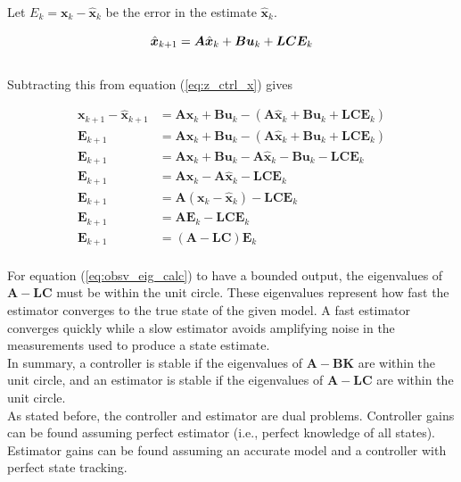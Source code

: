 \documentclass[10pt,conference,compsoc]{IEEEtran}
\newcommand{\mtx}[1] {\bm #1}
\begin{document}
Let $E_k = \mtx{x}_k - \hat{\mtx{x}}_k$ be the error in the estimate
$\hat{\mtx{x}}_k$.

\begin{equation*}
  \hat{\mtx{x}}_{k+1} = \mtx{A}\hat{\mtx{x}}_k + \mtx{B}\mtx{u}_k +
    \mtx{L}\mtx{C}\mtx{E}_k \\
\end{equation*}
\\
Subtracting this from equation (\ref{eq:z_ctrl_x}) gives

\begin{align}
  \mtx{x}_{k+1} - \hat{\mtx{x}}_{k+1} &= \mtx{A}\mtx{x}_k + \mtx{B}\mtx{u}_k -
    (\mtx{A}\hat{\mtx{x}}_k + \mtx{B}\mtx{u}_k +
     \mtx{L}\mtx{C}\mtx{E}_k) \nonumber \\
  \mtx{E}_{k+1} &= \mtx{A}\mtx{x}_k + \mtx{B}\mtx{u}_k -
    (\mtx{A}\hat{\mtx{x}}_k + \mtx{B}\mtx{u}_k + \mtx{L}\mtx{C}\mtx{E}_k)
    \nonumber \\
  \mtx{E}_{k+1} &= \mtx{A}\mtx{x}_k + \mtx{B}\mtx{u}_k -
    \mtx{A}\hat{\mtx{x}}_k - \mtx{B}\mtx{u}_k - \mtx{L}\mtx{C}\mtx{E}_k
    \nonumber \\
  \mtx{E}_{k+1} &= \mtx{A}\mtx{x}_k - \mtx{A}\hat{\mtx{x}}_k -
    \mtx{L}\mtx{C}\mtx{E}_k \nonumber \\
  \mtx{E}_{k+1} &= \mtx{A}(\mtx{x}_k - \hat{\mtx{x}}_k) -
    \mtx{L}\mtx{C}\mtx{E}_k \nonumber \\
  \mtx{E}_{k+1} &= \mtx{A}\mtx{E}_k - \mtx{L}\mtx{C}\mtx{E}_k \nonumber \\
  \mtx{E}_{k+1} &= (\mtx{A} - \mtx{L}\mtx{C})\mtx{E}_k \label{eq:obsv_eig_calc}
\end{align}
\\
For equation (\ref{eq:obsv_eig_calc}) to have a bounded output, the eigenvalues
of $\mtx{A} - \mtx{L}\mtx{C}$ must be within the unit circle. These eigenvalues
represent how fast the estimator converges to the true state of the given model.
A fast estimator converges quickly while a slow estimator avoids amplifying
noise in the measurements used to produce a state estimate. \\

In summary, a controller is stable if the eigenvalues of
$\mtx{A} - \mtx{B}\mtx{K}$ are within the unit circle, and an estimator is
stable if the eigenvalues of $\mtx{A} - \mtx{L}\mtx{C}$ are within the unit
circle. \\

As stated before, the controller and estimator are dual problems. Controller
gains can be found assuming perfect estimator (i.e., perfect knowledge of all
\glspl{state}). Estimator gains can be found assuming an accurate model and a
controller with perfect \gls{state tracking}.
\end{document}
